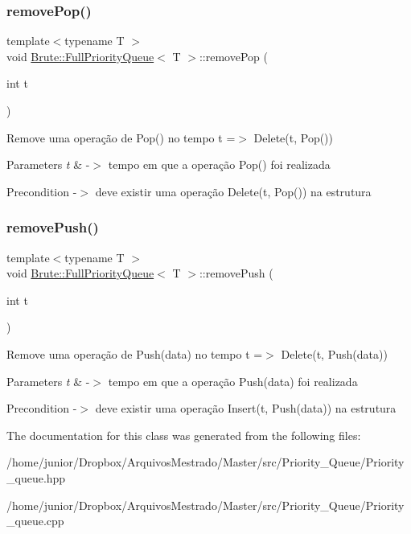 \subsubsection{\texorpdfstring{remove\+Pop()}{removePop()}}
{\footnotesize\ttfamily template$<$typename T $>$ \\
void \hyperlink{classBrute_1_1FullPriorityQueue}{Brute\+::\+Full\+Priority\+Queue}$<$ T $>$\+::remove\+Pop (\begin{DoxyParamCaption}\item[{int}]{t }\end{DoxyParamCaption})}

Remove uma operação de Pop() no tempo t =$>$ Delete(t, Pop())


\begin{DoxyParams}{Parameters}
{\em t} & -\/$>$ tempo em que a operação Pop() foi realizada \\
\hline
\end{DoxyParams}
\begin{DoxyPrecond}{Precondition}
-\/$>$ deve existir uma operação Delete(t, Pop()) na estrutura 
\end{DoxyPrecond}
\mbox{\label{classBrute_1_1FullPriorityQueue_a3faa79fc9fad31f2572d80df3beea392}} 
\subsubsection{\texorpdfstring{remove\+Push()}{removePush()}}
{\footnotesize\ttfamily template$<$typename T $>$ \\
void \hyperlink{classBrute_1_1FullPriorityQueue}{Brute\+::\+Full\+Priority\+Queue}$<$ T $>$\+::remove\+Push (\begin{DoxyParamCaption}\item[{int}]{t }\end{DoxyParamCaption})}

Remove uma operação de Push(data) no tempo t =$>$ Delete(t, Push(data))


\begin{DoxyParams}{Parameters}
{\em t} & -\/$>$ tempo em que a operação Push(data) foi realizada \\
\hline
\end{DoxyParams}
\begin{DoxyPrecond}{Precondition}
-\/$>$ deve existir uma operação Insert(t, Push(data)) na estrutura 
\end{DoxyPrecond}


The documentation for this class was generated from the following files\+:\begin{DoxyCompactItemize}
\item 
/home/junior/\+Dropbox/\+Arquivos\+Mestrado/\+Master/src/\+Priority\+\_\+\+Queue/Priority\+\_\+queue.\+hpp\item 
/home/junior/\+Dropbox/\+Arquivos\+Mestrado/\+Master/src/\+Priority\+\_\+\+Queue/Priority\+\_\+queue.\+cpp\end{DoxyCompactItemize}
